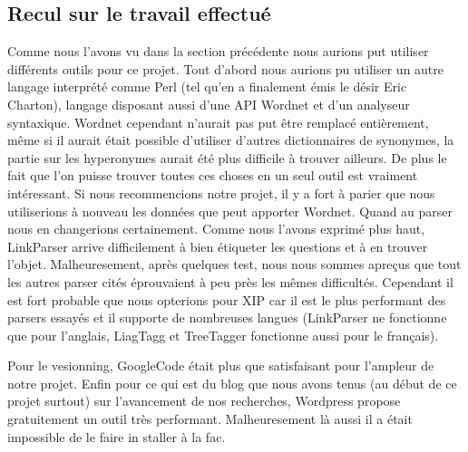 \documentclass[10pt,a4paper]{article}
\begin{document}
\subsection{Recul sur le travail effectué}
\par Comme nous l'avons vu dans la section précédente nous aurions put utiliser différents outils pour ce projet. Tout d'abord nous aurions pu utiliser un autre langage interprété comme Perl (tel qu'en a finalement émis le désir Eric Charton), langage disposant aussi d'une API Wordnet et d'un analyseur syntaxique. Wordnet cependant n'aurait pas put être remplacé entièrement, même si il aurait était possible d'utiliser d'autres dictionnaires de synonymes, la partie sur les hyperonymes aurait été plus difficile à trouver ailleurs. De plus le fait que l'on puisse trouver toutes ces choses en un seul outil est vraiment intéressant. Si nous recommencions notre projet, il y a fort à parier que nous utiliserions à nouveau les données que peut apporter Wordnet. Quand au parser nous en changerions certainement. Comme nous l'avons exprimé plus haut, LinkParser arrive difficilement à bien étiqueter les questions et à en trouver l'objet. Malheuresement, après quelques test, nous nous sommes apreçus que tout les autres parser cités éprouvaient à peu près les mêmes difficultés. Cependant il est fort probable que nous opterions pour XIP car il est le plus performant des parsers essayés et il supporte de nombreuses langues (LinkParser ne fonctionne que pour l'anglais, LiagTagg et TreeTagger fonctionne aussi pour le français).
\par Pour le vesionning, GoogleCode était plus que satisfaisant pour l'ampleur de notre projet. Enfin pour ce qui est du blog que nous avons tenus (au début de ce projet surtout) sur l'avancement de nos recherches, Wordpress propose gratuitement un outil très performant. Malheuresement là aussi il a était impossible de le faire in staller à la fac.
\end{document}
